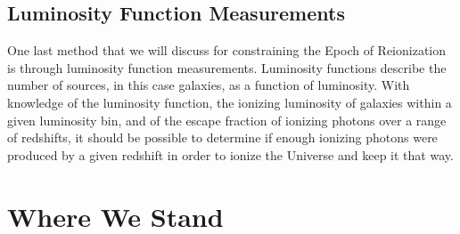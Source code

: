 % 


\subsection{Luminosity Function Measurements}

One last method that we will discuss for constraining the Epoch of Reionization is through luminosity function measurements. Luminosity functions describe the number of sources, in this case galaxies, as a function of luminosity. With knowledge of the luminosity function, the ionizing luminosity of galaxies within a given luminosity bin, and of the escape fraction of ionizing photons over a range of redshifts, it should be possible to determine if enough ionizing photons were produced by a given redshift in order to ionize the Universe and keep it that way. 





\section{Where We Stand}




